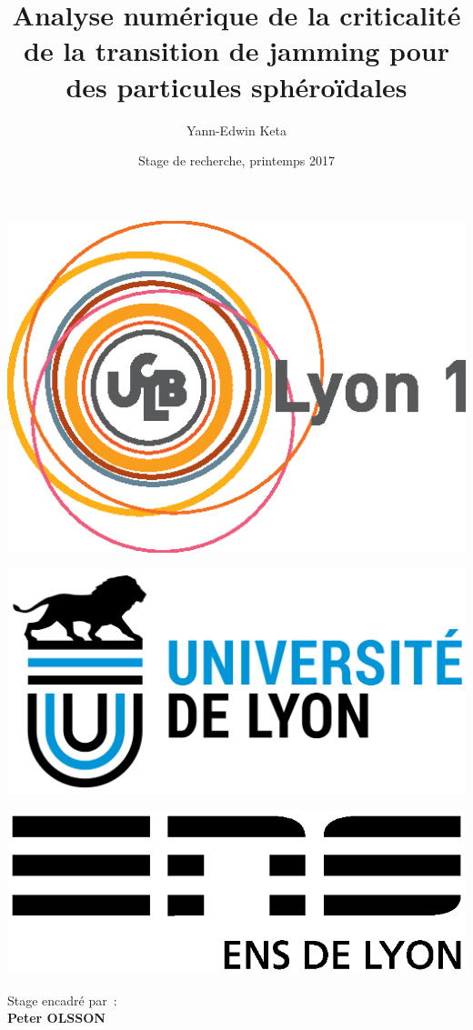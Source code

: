 \documentclass{beamer}
\title{Analyse numérique de la criticalité de la transition de jamming pour des particules sphéroïdales}
\author{Yann-Edwin Keta}
\date{Stage de recherche, printemps 2017}
\begin{document}

\begin{frame}

\begin{minipage}{0.2\linewidth}
\includegraphics[scale=0.4]{logoucbl.eps}
\end{minipage}
\hfill
\begin{minipage}{0.2\linewidth}
\includegraphics[scale=0.13]{udl-logo.png}
\end{minipage}
\hfill
\begin{minipage}{0.2\linewidth}
\includegraphics[scale=0.25]{logoens.eps}
\end{minipage}
\titlepage
\begin{minipage}{\linewidth}
\begin{center}
{\small Stage encadré par~:}\\ 
\textbf{Peter OLSSON}
\end{center}
\end{minipage}

\end{frame}
\end{document}
